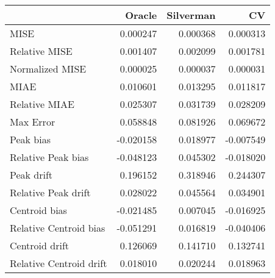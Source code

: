 \begin{tabular}{lrrr}
  \hline
 & Oracle & Silverman & CV \\ 
  \hline
MISE & 0.000247 & 0.000368 & 0.000313 \\ 
  Relative MISE & 0.001407 & 0.002099 & 0.001781 \\ 
  Normalized MISE & 0.000025 & 0.000037 & 0.000031 \\ 
  MIAE & 0.010601 & 0.013295 & 0.011817 \\ 
  Relative MIAE & 0.025307 & 0.031739 & 0.028209 \\ 
  Max Error & 0.058848 & 0.081926 & 0.069672 \\ 
  Peak bias & -0.020158 & 0.018977 & -0.007549 \\ 
  Relative Peak bias & -0.048123 & 0.045302 & -0.018020 \\ 
  Peak drift & 0.196152 & 0.318946 & 0.244307 \\ 
  Relative Peak drift & 0.028022 & 0.045564 & 0.034901 \\ 
  Centroid bias & -0.021485 & 0.007045 & -0.016925 \\ 
  Relative Centroid bias & -0.051291 & 0.016819 & -0.040406 \\ 
  Centroid drift & 0.126069 & 0.141710 & 0.132741 \\ 
  Relative Centroid drift & 0.018010 & 0.020244 & 0.018963 \\ 
   \hline
\end{tabular}
